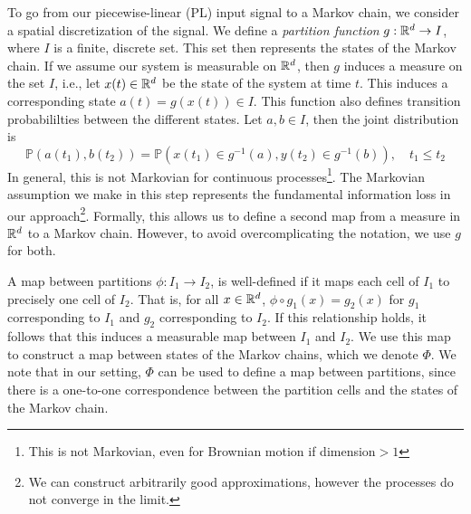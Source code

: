 To go from our piecewise-linear (PL) input signal to a Markov chain, we consider a spatial discretization of the signal.
We define a \emph{partition function} $g:\mathbb{R}^d\rightarrow I$, where $I$ is a finite, discrete set. This set then represents the states of the Markov chain. If we assume our system is measurable on $\mathbb{R}^d$, then $g$ induces a measure on the set $I$, i.e., let $x(t)\in \mathbb{R}^d$ be the state of the system at time $t$. This induces a corresponding  state $a(t) = g(x(t)) \in I$. This function also defines transition probabililties between the different states. Let $a,b\in I$, then the joint distribution is
    $$\mathbb{P}(a(t_1),b(t_2)) = \mathbb{P}\left(x(t_1)\in g^{-1}(a), y(t_2) \in g^{-1}(b)\right), 	 \quad t_1\leq t_2$$
 In general, this is not Markovian for continuous processes\footnote{This is not Markovian, even for Brownian motion if dimension$>1$ }. The Markovian assumption we make in this step represents the fundamental information loss in our approach\footnote{We can construct arbitrarily good approximations, however the processes do not converge in the limit.}.
Formally, this allows us to define a second map from a measure in $\mathbb{R}^d$ to a Markov chain. However, to avoid overcomplicating the notation, we use $g$ for both. 

 A map between partitions $\phi: I_1 \rightarrow I_2$, is well-defined if it maps each cell of $I_1$ to precisely one cell of $I_2$. That is, for all $x\in\mathbb{R}^d$, ${\phi\circ g_1(x) =  g_2(x)}$ for $g_1$ corresponding to $I_1$ and $g_2$ corresponding to $I_2$. If this relationship holds, it follows that this induces a measurable map between $I_1$ and $I_2$. We use this map to construct a map between states of the Markov chains, which we denote $\Phi$.  We note that in our setting, $\Phi$ can be used to define a map between partitions, since there is a one-to-one correspondence between the partition cells and the states of the Markov chain.  



